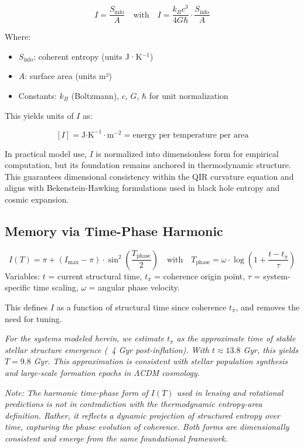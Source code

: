 \documentclass[11pt]{article}
\begin{document}
\[
I = \frac{S_{\text{info}}}{A}
\quad \text{with} \quad
I = \frac{k_B c^3}{4 G \hbar} \cdot \frac{S_{\text{info}}}{A}
\]

Where:
\begin{itemize}
  \item \( S_{\text{info}} \): coherent entropy (units J·K\(^{-1}\))
  \item \( A \): surface area (units m²)
  \item Constants: \( k_B \) (Boltzmann), \( c \), \( G \), \( \hbar \) for unit normalization
\end{itemize}

This yields units of \( I \) as:

\[
[I] = \text{J·K}^{-1} \cdot \text{m}^{-2} = \text{energy per temperature per area}
\]

In practical model use, \( I \) is normalized into dimensionless form for empirical computation, but its foundation remains anchored in thermodynamic structure. This guarantees dimensional consistency within the QIR curvature equation and aligns with Bekenstein-Hawking formulations used in black hole entropy and cosmic expansion.

\subsection{Memory via Time-Phase Harmonic}
\[
I(T) = \pi + (I_{\text{max}} - \pi) \cdot \sin^2\left(\frac{T_{\text{phase}}}{2}\right)
\quad \text{with} \quad T_{\text{phase}} = \omega \cdot \log\left(1 + \frac{t - t_\pi}{\tau} \right)
\]
Variables: \(t\) = current structural time, \(t_\pi\) = coherence origin point, \(\tau\) = system-specific time scaling, \(\omega\) = angular phase velocity.


This defines \(I\) as a function of structural time since coherence \(t_\pi\), and removes the need for tuning.

\textit{For the systems modeled herein, we estimate $t_\pi$ as the approximate time of stable stellar structure emergence (~4 Gyr post-inflation). With $t \approx 13.8$ Gyr, this yields $T = 9.8$ Gyr. This approximation is consistent with stellar population synthesis and large-scale formation epochs in $\Lambda$CDM cosmology.}

\textit{Note: The harmonic time-phase form of \( I(T) \) used in lensing and rotational predictions is not in contradiction with the thermodynamic entropy-area definition. Rather, it reflects a dynamic projection of structured entropy over time, capturing the phase evolution of coherence. Both forms are dimensionally consistent and emerge from the same foundational framework.}
\end{document}
